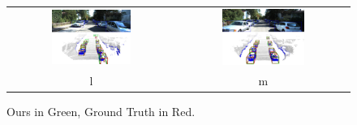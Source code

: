 \begin{figure}
\begin{tabular}{c c}
        \includegraphics[width=0.5\textwidth]{figures/Qualitative_examples/405.png}
        &
        \includegraphics[width=0.5\textwidth]{figures/Qualitative_examples/411.png}
        \\
        l & m \\
    \end{tabular}
    \caption{Ours in Green, Ground Truth in Red.}
    \label{f:Qualitative_supp2}
\end{figure}